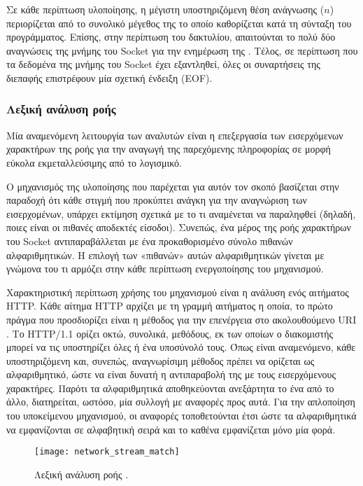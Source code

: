 Σε κάθε περίπτωση υλοποίησης, η μέγιστη υποστηριζόμενη θέση ανάγνωσης ($n$)
περιορίζεται από το συνολικό μέγεθος της  το οποίο καθορίζεται κατά τη
σύνταξη του προγράμματος. Επίσης, στην περίπτωση του δακτυλίου, απαιτούνται το
πολύ δύο αναγνώσεις της μνήμης του Socket για την ενημέρωση της .
Τέλος, σε περίπτωση που τα δεδομένα της μνήμης του Socket έχει εξαντληθεί, όλες
οι συναρτήσεις της διεπαφής επιστρέφουν μία σχετική ένδειξη (EOF).


\subsubsection{Λεξική ανάλυση ροής}
\label{ssubsec:network:stream-match}

Μία αναμενόμενη λειτουργία των αναλυτών είναι η επεξεργασία των εισερχόμενων
χαρακτήρων της ροής για την αναγωγή της παρεχόμενης πληροφορίας σε μορφή εύκολα
εκμεταλλεύσιμης από το λογισμικό.

Ο μηχανισμός της υλοποίησης που παρέχεται για αυτόν τον σκοπό βασίζεται στην
παραδοχή ότι κάθε στιγμή που προκύπτει ανάγκη για την αναγνώριση των
εισερχομένων, υπάρχει εκτίμηση σχετικά με το τι αναμένεται να παραληφθεί
(δηλαδή, ποιες είναι οι πιθανές αποδεκτές είσοδοι). Συνεπώς, ένα μέρος της ροής
χαρακτήρων του Socket αντιπαραβάλλεται με ένα προκαθορισμένο σύνολο πιθανών
αλφαριθμητικών. Η επιλογή των «πιθανών» αυτών αλφαριθμητικών γίνεται με γνώμονα
του τι αρμόζει στην κάθε περίπτωση ενεργοποίησης του μηχανισμού.

Χαρακτηριστική περίπτωση χρήσης του μηχανισμού είναι η ανάλυση ενός αιτήματος
HTTP. Κάθε αίτημα HTTP αρχίζει με τη γραμμή αιτήματος η οποία, το πρώτο πράγμα
που προσδιορίζει είναι η μέθοδος για την επενέργεια στο ακολουθούμενο URI
\parencite[35]{rfc2616}. Το HTTP\slash 1.1 ορίζει οκτώ, συνολικά, μεθόδους, εκ
των οποίων ο διακομιστής μπορεί να τις υποστηρίζει όλες ή ένα υποσύνολό τους.
Όπως είναι αναμενόμενο, κάθε υποστηριζόμενη και, συνεπώς, αναγνωρίσιμη μέθοδος
πρέπει να ορίζεται ως αλφαριθμητικό, ώστε να είναι δυνατή η αντιπαραβολή της με
τους εισερχόμενους χαρακτήρες. Παρότι τα αλφαριθμητικά αποθηκεύονται ανεξάρτητα
το ένα από το άλλο, διατηρείται, ωστόσο, μία συλλογή με αναφορές προς αυτά.
Για την απλοποίηση του υποκείμενου μηχανισμού, οι αναφορές τοποθετούνται έτσι
ώστε τα αλφαριθμητικά να εμφανίζονται σε αλφαβητική σειρά και το καθένα
εμφανίζεται μόνο μία φορά.

\begin{figure}
    \caption{Λεξική ανάλυση ροής . \label{fig:network:stream_match}}
    \begin{center}
    \texttt{[image: network\_stream\_match]}
    \end{center}
\end{figure}

